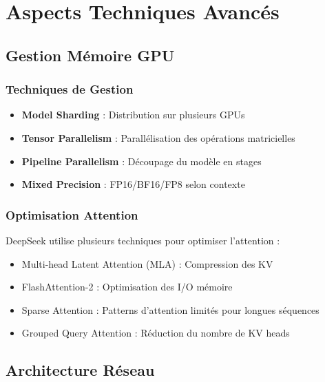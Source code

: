 \documentclass[12pt,a4paper]{article}
\begin{document}
\newpage
\section{ Aspects Techniques Avancés}

\subsection{Gestion Mémoire GPU}

\subsubsection{Techniques de Gestion}
\begin{tcolorbox}[
    enhanced,
    colback=accent!5,
    colframe=accent,
    boxrule=0pt,
    leftrule=4pt,
    sharp corners
]
\begin{itemize}
    \item \textbf{Model Sharding} : Distribution sur plusieurs GPUs
    \item \textbf{Tensor Parallelism} : Parallélisation des opérations matricielles
    \item \textbf{Pipeline Parallelism} : Découpage du modèle en stages
    \item \textbf{Mixed Precision} : FP16/BF16/FP8 selon contexte
\end{itemize}
\end{tcolorbox}

\subsubsection{Optimisation Attention}
DeepSeek utilise plusieurs techniques pour optimiser l'attention :
\begin{itemize}[leftmargin=*,label={\color{primary}\faBolt}]
    \item Multi-head Latent Attention (MLA) : Compression des KV
    \item FlashAttention-2 : Optimisation des I/O mémoire
    \item Sparse Attention : Patterns d'attention limités pour longues séquences
    \item Grouped Query Attention : Réduction du nombre de KV heads
\end{itemize}




\subsection{Architecture Réseau}
\end{document}
